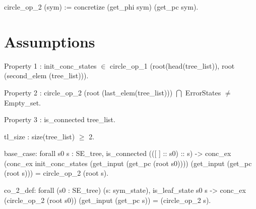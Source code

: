\begin{define}
circle\_op\_2 (sym) :=
concretize (get\_phi sym) (get\_pc sym).
\end{define}


\section{Assumptions}
\begin{property}
Property 1 : init\_conc\_states $\in $ circle\_op\_1 (root(head(tree\_list)), root (second\_elem (tree\_list))).
\end{property}

\begin{property}
Property 2 :  circle\_op\_2 (root (last\_elem(tree\_list))) $\bigcap$ ErrorStates
$\neq$ Empty\_set.
\end{property}

\begin{property}
Property 3 :  is\_connected tree\_list.
\end{property}

\begin{property}
tl\_size : size(tree\_list) $\geq$ 2.
\end{property}


\begin{property}
base\_case: 
forall s0 s : SE\_tree,
is\_connected (([ ] :: s0) :: s) ->
conc\_ex
  (conc\_ex init\_conc\_states
     (get\_input (get\_pc (root s0))))
  (get\_input (get\_pc (root s))) =
circle\_op\_2 (root s).
\end{property}

\begin{property}
 co\_2\_def:
forall (s0 : SE\_tree) (s: sym\_state),
is\_leaf\_state s0 s ->
conc\_ex (circle\_op\_2 (root s0))
  (get\_input (get\_pc s)) =
(circle\_op\_2  s).
\end{property}




